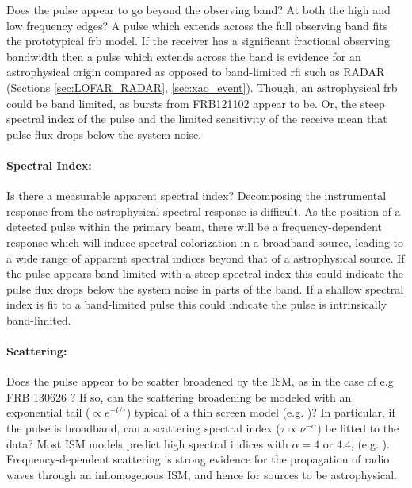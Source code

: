 \documentclass[a4paper,fleqn,usenatbib]{mnras}
\begin{document}
Does the pulse appear to go beyond the observing band? At both the high and low
frequency edges? A pulse which extends across the full observing band fits the
prototypical \gls{frb} model. If the receiver has a significant fractional
observing bandwidth then a pulse which extends across the band is evidence for
an astrophysical origin compared as opposed to band-limited \gls{rfi} such as
RADAR (Sections \ref{sec:LOFAR_RADAR}, \ref{sec:xao_event}). Though, an
astrophysical \gls{frb} could be band limited, as bursts from FRB121102 appear
to be. Or, the steep spectral index of the pulse and the limited sensitivity of
the receive mean that pulse flux drops below the system noise.

\paragraph{Spectral Index:}

Is there a measurable apparent spectral index? Decomposing the instrumental
response from the astrophysical spectral response is difficult.  As the position
of a detected pulse within the primary beam, there will be a frequency-dependent
response which will induce spectral colorization in a broadband source, leading
to a wide range of apparent spectral indices beyond that of a astrophysical
source. If the pulse appears band-limited with a steep spectral index this could
indicate the pulse flux drops below the system noise in parts of the band. If a
shallow spectral index is fit to a band-limited pulse this could indicate the
pulse is intrinsically band-limited.

\paragraph{Scattering:}

Does the pulse appear to be scatter broadened by the ISM, as in the case of e.g FRB 130626 \cite{2016MNRAS.460L..30C}? If so, can the scattering broadening be modeled with an exponential tail ($\propto e^{-t/\tau}$) typical of a thin screen model (e.g. \citealt{Williamson1972})? In particular, if the pulse is broadband, can a scattering spectral index ($\tau \propto \nu^{-\alpha}$) be fitted to the data? Most ISM models predict high spectral indices with $\alpha =4$ or $4.4$, (e.g. \citealt{Rickett1977}). Frequency-dependent scattering is strong evidence for the propagation of radio waves through an inhomogenous ISM, and hence for sources to be astrophysical. 
\end{document}
